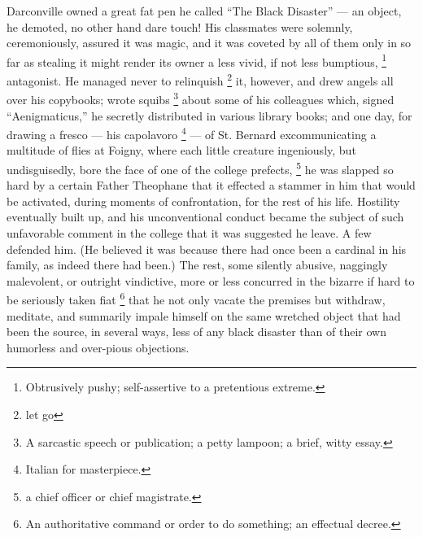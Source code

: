   Darconville owned a great fat pen he called “The Black Disaster” --- an object,
he demoted, no other hand dare touch! His classmates were solemnly,
ceremoniously, assured it was magic, and it was coveted by all of them only in
so far as stealing it might render its owner a less vivid, if not less
bumptious, 
\footnote{Obtrusively pushy; self-assertive to a pretentious extreme.}
antagonist. He managed never to relinquish 
\footnote{let go}
it, however, and drew
angels all over his copybooks; wrote squibs 
\footnote{A sarcastic speech or publication; a petty lampoon; a brief, witty
essay.}
about some of his colleagues which,
signed “Aenigmaticus,” he secretly distributed in various library books; and one
day, for drawing a fresco --- his capolavoro
\footnote{Italian for masterpiece.}
--- of St. Bernard excommunicating a
multitude of flies at Foigny, where each little creature ingeniously, but
undisguisedly, bore the face of one of the college prefects, 
\footnote{a chief officer or chief magistrate.}
he was slapped so
hard by a certain Father Theophane that it effected a stammer in him that would
be activated, during moments of confrontation, for the rest of his life.
Hostility eventually built up, and his unconventional conduct became the subject
of such unfavorable comment in the college that it was suggested he leave. A few
defended him. (He believed it was because there had once been a cardinal in his
family, as indeed there had been.) The rest, some silently abusive, naggingly
malevolent, or outright vindictive, more or less concurred in the bizarre if
hard to be seriously taken fiat 
\footnote{An authoritative command or order to do something; an effectual
decree.}
that he not only vacate the premises but
withdraw, meditate, and summarily impale himself on the same wretched object
that had been the source, in several ways, less of any black disaster than of
their own humorless and over-pious objections.

